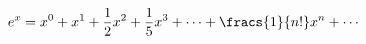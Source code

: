 \documentclass[preview]{standalone}
\begin{document}
\begin{align*}
e^x = x^0 + x^1 + \frac{1}{2} x^2 + \frac{1}{5} x^3 + \cdots + \fracs{1}{n!} x^n + \cdots
\end{align*}
\end{document}
